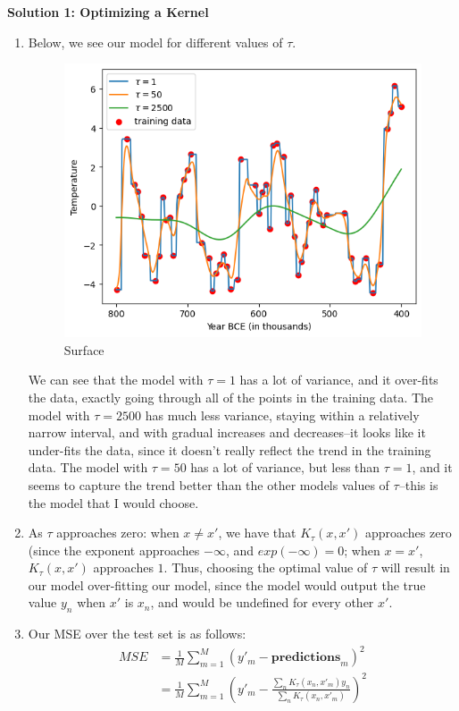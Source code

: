 \documentclass[submit]{harvardml}
\begin{document}
{\bf Solution 1: Optimizing a Kernel}
\begin{enumerate}
\item 
    Below, we see our model for different values of $\tau$.
    \begin{figure}[h]
        \centering
        \includegraphics[scale=0.75]{images/p1.1.png}
        \caption{Surface}
        \label{fig:q-2-3}
    \end{figure}
    We can see that the model with $\tau = 1$ has a lot of variance, and it over-fits the data, exactly going through all of the points in the training data. The model with $\tau = 2500$ has much less variance, staying within a relatively narrow interval, and with gradual increases and decreases--it looks like it under-fits the data, since it doesn't really reflect the trend in the training data. The model with $\tau = 50$ has a lot of variance, but less than $\tau = 1$, and it seems to capture the trend better than the other models values of $\tau$--this is the model that I would choose.

\item
    As $\tau$ approaches zero: when $x \neq x'$, we have that $K_\tau(x, x')$ approaches zero (since the exponent approaches $-\infty$, and $exp(-\infty) = 0$; when $x = x'$, $K_\tau(x, x')$ approaches $1$. Thus, choosing the optimal value of $\tau$ will result in our model over-fitting our model, since the model would output the true value $y_n$ when $x'$ is $x_n$, and would be undefined for every other $x'$. 

\item
    Our MSE over the test set is as follows:
    \begin{align}
        MSE &= \frac{1}{M} \sum_{m=1}^M \left(y'_m - \textbf{predictions}_m \right)^2\\
        &= \frac{1}{M} \sum_{m=1}^M\left(y'_m - \frac{\sum_n K_\tau(x_n, x'_m) y_n}{\sum_n K_\tau(x_n, x'_m)} \right)^2
    \end{align}


\end{enumerate}
\end{document}

